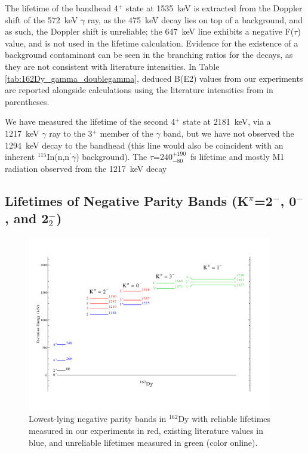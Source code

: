 The lifetime of the bandhead 4$^+$ state at 1535~keV is extracted from the Doppler shift of the 572~keV $\gamma$ ray, as the 475~keV decay lies on top of a background, and as such, the Doppler shift is unreliable; the 647~keV line exhibits a negative F($\tau$) value, and is not used in the lifetime calculation. Evidence for the existence of a background contaminant can be seen in the branching ratios for the decays, as they are not consistent with literature intensities. In Table \ref{tab:162Dy_gamma_doublegamma}, deduced B(E2) values from our experiments are reported alongside calculations using the literature intensities from \cite{Aprahamian200642} in parentheses.

We have measured the lifetime of the second 4$^+$ state at 2181~keV, via a 1217~keV $\gamma$ ray to the 3$^+$ member of the $\gamma$ band, but we have not observed the 1294~keV decay to the bandhead (this line would also be coincident with an inherent $^{115}$In(n,n$^\prime\gamma$) background). The $\tau$=240$^{+190}_{-80}$~fs lifetime and mostly M1 radiation observed from the 1217~keV decay
\subsection{Lifetimes of Negative Parity Bands (K$^\pi$=2$^-$, 0$^-$, and 2$^-_2$)}


\begin{figure}[h!] 
\begin{center}
\includegraphics[width=0.95\textwidth]{162Dy_LLoct.pdf}
\caption{Lowest-lying negative parity bands in $^{162}$Dy with reliable lifetimes measured in our experiments in red, existing literature values in blue, and unreliable lifetimes measured in green (color online). \label{fig:162Dy_LLoct}}
\end{center}
\end{figure}

